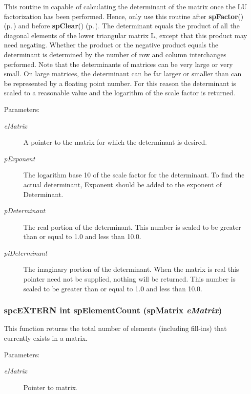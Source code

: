 This routine in capable of calculating the determinant of the matrix once the LU factorization has been performed. Hence, only use this routine after {\bf sp\-Factor}() {\rm (p.\,\pageref{spMatrix_8h_a30})} and before {\bf sp\-Clear}() {\rm (p.\,\pageref{spMatrix_8h_a22})}. The determinant equals the product of all the diagonal elements of the lower triangular matrix L, except that this product may need negating. Whether the product or the negative product equals the determinant is determined by the number of row and column interchanges performed. Note that the determinants of matrices can be very large or very small. On large matrices, the determinant can be far larger or smaller than can be represented by a floating point number. For this reason the determinant is scaled to a reasonable value and the logarithm of the scale factor is returned.\begin{Desc}
\item[Parameters: ]\par
\begin{description}
\item[{\em 
e\-Matrix}]A pointer to the matrix for which the determinant is desired. \item[{\em 
p\-Exponent}]The logarithm base 10 of the scale factor for the determinant. To find the actual determinant, Exponent should be added to the exponent of Determinant. \item[{\em 
p\-Determinant}]The real portion of the determinant. This number is scaled to be greater than or equal to 1.0 and less than 10.0. \item[{\em 
pi\-Determinant}]The imaginary portion of the determinant. When the matrix is real this pointer need not be supplied, nothing will be returned. This number is scaled to be greater than or equal to 1.0 and less than 10.0. \end{description}
\end{Desc}
\subsubsection{\setlength{\rightskip}{0pt plus 5cm}spc\-EXTERN int sp\-Element\-Count ({\bf sp\-Matrix} {\em e\-Matrix})}\label{spMatrix_8h_a27}


This function returns the total number of elements (including fill-ins) that currently exists in a matrix.\begin{Desc}
\item[Parameters: ]\par
\begin{description}
\item[{\em 
e\-Matrix}]Pointer to matrix. \end{description}
\end{Desc}
